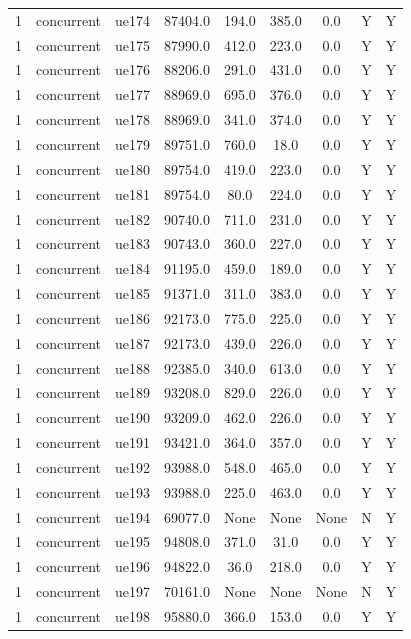 \begin{table}[ht]
\begin{tabular}{|c|c|c|c|c|c|c|c|c|}
1 & concurrent & ue174 & 87404.0 & 194.0 & 385.0 & 0.0 & Y & Y \\
1 & concurrent & ue175 & 87990.0 & 412.0 & 223.0 & 0.0 & Y & Y \\
1 & concurrent & ue176 & 88206.0 & 291.0 & 431.0 & 0.0 & Y & Y \\
1 & concurrent & ue177 & 88969.0 & 695.0 & 376.0 & 0.0 & Y & Y \\
1 & concurrent & ue178 & 88969.0 & 341.0 & 374.0 & 0.0 & Y & Y \\
1 & concurrent & ue179 & 89751.0 & 760.0 & 18.0 & 0.0 & Y & Y \\
1 & concurrent & ue180 & 89754.0 & 419.0 & 223.0 & 0.0 & Y & Y \\
1 & concurrent & ue181 & 89754.0 & 80.0 & 224.0 & 0.0 & Y & Y \\
1 & concurrent & ue182 & 90740.0 & 711.0 & 231.0 & 0.0 & Y & Y \\
1 & concurrent & ue183 & 90743.0 & 360.0 & 227.0 & 0.0 & Y & Y \\
1 & concurrent & ue184 & 91195.0 & 459.0 & 189.0 & 0.0 & Y & Y \\
1 & concurrent & ue185 & 91371.0 & 311.0 & 383.0 & 0.0 & Y & Y \\
1 & concurrent & ue186 & 92173.0 & 775.0 & 225.0 & 0.0 & Y & Y \\
1 & concurrent & ue187 & 92173.0 & 439.0 & 226.0 & 0.0 & Y & Y \\
1 & concurrent & ue188 & 92385.0 & 340.0 & 613.0 & 0.0 & Y & Y \\
1 & concurrent & ue189 & 93208.0 & 829.0 & 226.0 & 0.0 & Y & Y \\
1 & concurrent & ue190 & 93209.0 & 462.0 & 226.0 & 0.0 & Y & Y \\
1 & concurrent & ue191 & 93421.0 & 364.0 & 357.0 & 0.0 & Y & Y \\
1 & concurrent & ue192 & 93988.0 & 548.0 & 465.0 & 0.0 & Y & Y \\
1 & concurrent & ue193 & 93988.0 & 225.0 & 463.0 & 0.0 & Y & Y \\
1 & concurrent & ue194 & 69077.0 & None & None & None & N & Y \\
1 & concurrent & ue195 & 94808.0 & 371.0 & 31.0 & 0.0 & Y & Y \\
1 & concurrent & ue196 & 94822.0 & 36.0 & 218.0 & 0.0 & Y & Y \\
1 & concurrent & ue197 & 70161.0 & None & None & None & N & Y \\
1 & concurrent & ue198 & 95880.0 & 366.0 & 153.0 & 0.0 & Y & Y \\

\end{tabular}
\end{table}
